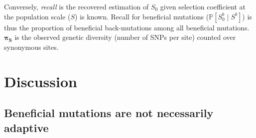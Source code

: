 \documentclass{article}
\newcommand{\proba}{\mathbb{P}}
\newcommand{\Sphy}{S_{0}}
\newcommand{\SphyBen}{\Sphy^{b}}
\newcommand{\given}{\mid}
\newcommand{\Spop}{S}
\newcommand{\SpopBen}{\Spop^{b}}
\begin{document}
\begin{table}[tb]
{            Conversely, \textit{recall} is the recovered estimation of $\Sphy$ given selection coefficient at the population scale ($\Spop$) is known.
            Recall for beneficial mutations ($\proba [\SphyBen \given \SpopBen]$) is thus the proportion of beneficial back-mutations among all beneficial mutations.
            $\bm{\pi_{\text{S}}}$ is the observed genetic diversity (number of SNPs per site) counted over synonymous sites.
        }
        \label{table:proba}
    \end{table}

\section*{Discussion}
    \subsection*{Beneficial mutations are not necessarily adaptive}
\end{document}
